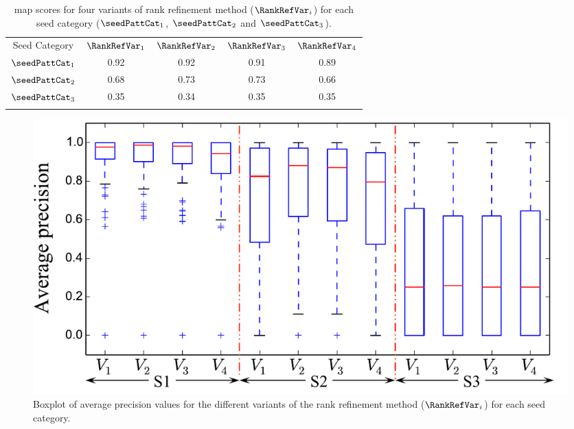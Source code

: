 \begin{table} 
	\begin{centering}	
		\begin{tabular}{ c | c c c c}
			\tabletop
			Seed Category   & $\RankRefVar_1$		&	$\RankRefVar_2$ & $\RankRefVar_3$	 &	$\RankRefVar_4$ 	\\	
			\tablemid
			$\seedPattCat_1$ & 0.92    &	0.92		&	0.91    &	0.89\\
			$\seedPattCat_2$ & 0.68    &	0.73		&	0.73    &	0.66\\
			$\seedPattCat_3$ & 0.35    &	0.34    &	0.35    &	0.35\\
			\tablebot
		\end{tabular}
		\caption{\gls{map} scores for four variants of rank refinement method ($\RankRefVar_i$) for each seed category ($\seedPattCat_1$, $\seedPattCat_2$ and $\seedPattCat_3$).}
		\label{tab:meanAveragePrecision_pattern_discovery}
		\par \end{centering}	
\end{table}

\begin{figure}
	\begin{center}
		\includegraphics[width=\figSizeHundred]{ch06_patterns/figures/discovery/boxPlot.pdf}
	\end{center}
	\caption{Boxplot of average precision values for the different variants of the rank refinement method ($\RankRefVar_i$) for each seed category.}
	\label{fig:boxPlotMAPPatternDiscovery}
\end{figure}

